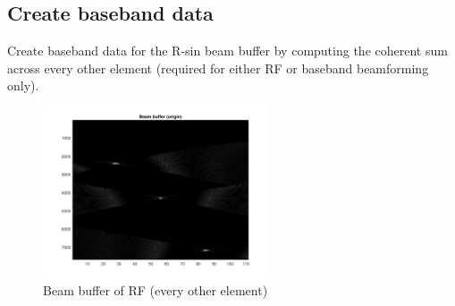 \documentclass{article}
\begin{document}
\subsection{Create baseband data}
Create baseband data for the R-sin beam buffer by computing the coherent sum across every other element (required for either RF or 
baseband beamforming only).
\begin{figure}[H]
    \centering
    \includegraphics[width=0.6\textwidth]{src/RF/b-3-ones-everyother.pdf}
    \caption{Beam buffer of RF (every other element)}
    \label{fig:RF-ones-everyones}
\end{figure}
\end{document}
